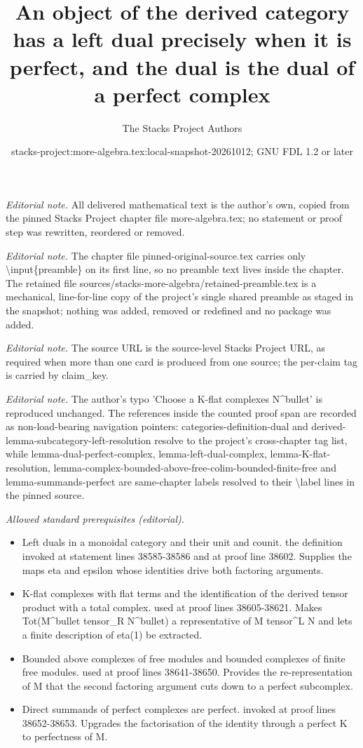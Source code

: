 \documentclass[10pt,a4paper]{amsart}
\title{An object of the derived category has a left dual precisely when it is perfect, and the dual is the dual of a perfect complex}
\author{The Stacks Project Authors}
\date{stacks-project:more-algebra.tex:local-snapshot-20261012; GNU FDL 1.2 or later}
\theoremstyle{plain}
\theoremstyle{definition}
\theoremstyle{remark}
\numberwithin{equation}{subsection}
\begin{document}
\maketitle
\setcounter{subsection}{1}
\noindent\textit{Editorial note.} All delivered mathematical text is the author's own, copied from the pinned Stacks Project chapter file more-algebra.tex; no statement or proof step was rewritten, reordered or removed.\par\medskip
\noindent\textit{Editorial note.} The chapter file pinned-original-source.tex carries only \textbackslash{}input\{preamble\} on its first line, so no preamble text lives inside the chapter. The retained file sources/stacks-more-algebra/retained-preamble.tex is a mechanical, line-for-line copy of the project's single shared preamble as staged in the snapshot; nothing was added, removed or redefined and no package was added.\par\medskip
\noindent\textit{Editorial note.} The source URL is the source-level Stacks Project URL, as required when more than one card is produced from one source; the per-claim tag is carried by claim\_key.\par\medskip
\noindent\textit{Editorial note.} The author's typo 'Choose a K-flat complexes N\textasciicircum{}bullet' is reproduced unchanged. The references inside the counted proof span are recorded as non-load-bearing navigation pointers: categories-definition-dual and derived-lemma-subcategory-left-resolution resolve to the project's cross-chapter tag list, while lemma-dual-perfect-complex, lemma-left-dual-complex, lemma-K-flat-resolution, lemma-complex-bounded-above-free-colim-bounded-finite-free and lemma-summands-perfect are same-chapter labels resolved to their \textbackslash{}label lines in the pinned source.\par\medskip
\noindent\textit{Allowed standard prerequisites (editorial).}\begin{itemize}
\item Left duals in a monoidal category and their unit and counit. the definition invoked at statement lines 38585-38586 and at proof line 38602. Supplies the maps eta and epsilon whose identities drive both factoring arguments.
\item K-flat complexes with flat terms and the identification of the derived tensor product with a total complex. used at proof lines 38605-38621. Makes Tot(M\textasciicircum{}bullet tensor\_R N\textasciicircum{}bullet) a representative of M tensor\textasciicircum{}L N and lets a finite description of eta(1) be extracted.
\item Bounded above complexes of free modules and bounded complexes of finite free modules. used at proof lines 38641-38650. Provides the re-representation of M that the second factoring argument cuts down to a perfect subcomplex.
\item Direct summands of perfect complexes are perfect. invoked at proof lines 38652-38653. Upgrades the factorisation of the identity through a perfect K to perfectness of M.
\end{itemize}\medskip
\end{document}
